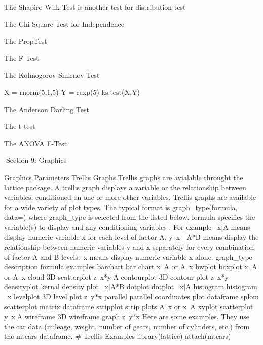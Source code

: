 The Shapiro Wilk Test is another test for distribution test





The Chi Square Test for Independence





The PropTest





The F Test





The Kolmogorov Smirnov Test

X = rnorm(5,1,5)
Y = rexp(5)
ks.test(X,Y)


The Anderson Darling Test






The t-test







The ANOVA F-Test

 
Section 9: Graphics


Graphics Parameters
Trellis Graphs
Trellis graphs are avialable throught the lattice package. A trellis graph displays a variable or the relationship between variables, conditioned on one or more other variables. Trellis graphs are available for a wide variety of plot types.
The typical format is
graph_type(formula, data=)
where graph_type is selected from the listed below. formula specifies the variable(s) to display and any conditioning variables . For example ~x|A means display numeric variable x for each level of factor A. y~x | A*B means display the relationship between numeric variables y and x separately for every combination of factor A and B levels.~x means display numeric variable x alone.
graph_type
description
formula examples
barchart
bar chart
x~A or A~x
bwplot
boxplot
x~A or A~x
cloud
3D scatterplot
z~x*y|A
contourplot
3D contour plot
z~x*y
densityplot
kernal density plot
~x|A*B
dotplot
dotplot
~x|A
histogram
histogram
~x
levelplot
3D level plot
z~y*x
parallel
parallel coordinates plot
dataframe
splom
scatterplot matrix
dataframe
stripplot
strip plots
A~x or x~A
xyplot
scatterplot
y~x|A
wireframe
3D wireframe graph
z~y*x
Here are some examples. They use the car data (mileage, weight, number of gears, number of cylinders, etc.) from the mtcars dataframe.
# Trellis Examples 
library(lattice) 
attach(mtcars)

